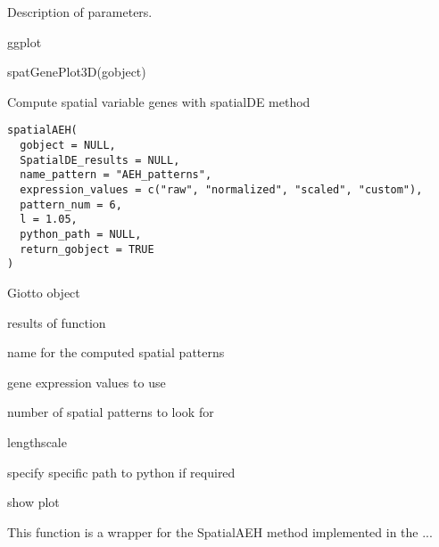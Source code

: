 \documentclass[a4paper]{book}
\begin{document}
%
\begin{Details}\relax
Description of parameters.
\end{Details}
%
\begin{Value}
ggplot
\end{Value}
%
\begin{Examples}
\begin{ExampleCode}
    spatGenePlot3D(gobject)
\end{ExampleCode}
\end{Examples}
%
\begin{Description}\relax
Compute spatial variable genes with spatialDE method
\end{Description}
%
\begin{Usage}
\begin{verbatim}
spatialAEH(
  gobject = NULL,
  SpatialDE_results = NULL,
  name_pattern = "AEH_patterns",
  expression_values = c("raw", "normalized", "scaled", "custom"),
  pattern_num = 6,
  l = 1.05,
  python_path = NULL,
  return_gobject = TRUE
)
\end{verbatim}
\end{Usage}
%
\begin{Arguments}
\begin{ldescription}
\item[\code{gobject}] Giotto object

\item[\code{SpatialDE\_results}] results of  function

\item[\code{name\_pattern}] name for the computed spatial patterns

\item[\code{expression\_values}] gene expression values to use

\item[\code{pattern\_num}] number of spatial patterns to look for

\item[\code{l}] lengthscale

\item[\code{python\_path}] specify specific path to python if required

\item[\code{return\_gobject}] show plot
\end{ldescription}
\end{Arguments}
%
\begin{Details}\relax
This function is a wrapper for the SpatialAEH method implemented in the ...
\end{Details}
\end{document}
